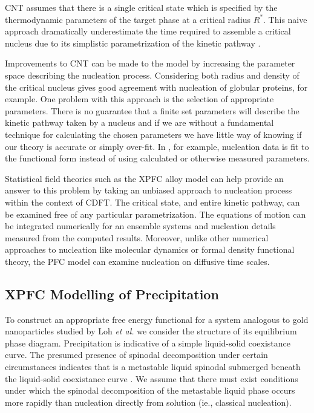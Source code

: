 
CNT assumes that there is a single critical state which is specified by the
thermodynamic parameters of the target phase at a critical radius $R^*$. This
naive approach dramatically underestimate the time required to assemble a
critical nucleus due to its simplistic parametrization of the kinetic pathway
\cite{LUTSKO15, MYERSON04, MYERSON09}.

Improvements to CNT can be made to the model by increasing the parameter space
describing the nucleation process. Considering both radius and density of the
critical nucleus \cite{LUTSKO15} gives good agreement with nucleation of
globular proteins, for example. One problem with this approach is the selection
of appropriate parameters. There is no guarantee that a finite set parameters
will describe the kinetic pathway taken by a nucleus and if we are without a
fundamental technique for calculating the chosen parameters we have little way
of knowing if our theory is accurate or simply over-fit. In \cite{MYERSON09},
for example, nucleation data is fit to the functional form instead of using
calculated or otherwise measured parameters.


Statistical field theories such as the XPFC alloy model can help provide an
answer to this problem by taking an unbiased approach to nucleation process
within the context of CDFT.  The critical state, and entire kinetic pathway,
can be examined free of any particular parametrization. The equations of motion
can be integrated numerically for an ensemble systems and nucleation details
measured from the computed results.  Moreover, unlike other numerical
approaches to nucleation like molecular dynamics or formal density functional
theory, the PFC model can examine nucleation on diffusive time scales.

\subsection{XPFC Modelling of Precipitation} %


To construct an appropriate free energy functional for a system analogous to
gold nanoparticles studied by Loh \textit{et al.} \cite{LOH17} we consider the
structure of its equilibrium phase diagram. Precipitation is indicative of a
simple liquid-solid coexistance curve. The presumed presence of spinodal
decomposition under certain circumstances indicates that is a metastable liquid
spinodal submerged beneath the liquid-solid coexistance curve \cite{DAVEY13}.
We assume that there must exist conditions under which the spinodal
decomposition of the metastable liquid phase occurs more rapidly than
nucleation directly from solution (ie., classical nucleation).

